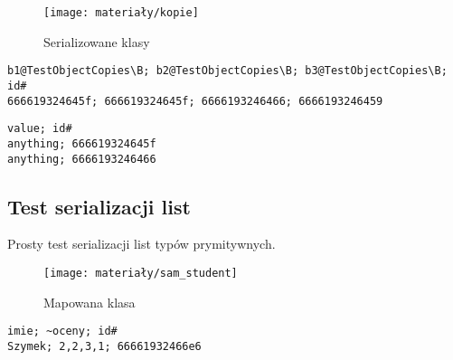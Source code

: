 \begin{figure}[ht]
	\centering
	\texttt{[image: materiały/kopie]}
	\caption{Serializowane klasy}
\end{figure}

\begin{empty}
	\begin{verbatim}
b1@TestObjectCopies\B; b2@TestObjectCopies\B; b3@TestObjectCopies\B; id#
666619324645f; 666619324645f; 6666193246466; 6666193246459
	\end{verbatim}
	\vspace{-10pt}
\end{empty}


\begin{empty}
	\begin{verbatim}
value; id#
anything; 666619324645f
anything; 6666193246466
	\end{verbatim}
	\vspace{-10pt}
\end{empty}

\subsection{Test serializacji list}
Prosty test serializacji list typów prymitywnych. 

\begin{figure}[ht]
	\centering
	\texttt{[image: materiały/sam\_student]}
	\caption{Mapowana klasa}
\end{figure}

\begin{empty}
	\begin{verbatim}
imie; ~oceny; id#
Szymek; 2,2,3,1; 66661932466e6
	\end{verbatim}
	\vspace{-10pt}
\end{empty}

